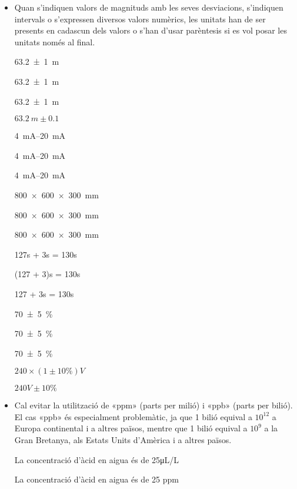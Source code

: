 \begin{itemize}

\item Quan s'indiquen valors de magnituds amb les seves desviacions,
s'indiquen intervals o s'expressen diversos valors numèrics, les
unitats han de ser presents en cadascun dels valors o s'han d'usar
parèntesis si es vol posar les unitats només al final.

\textcolor{Green}\faCheckSquare{} \SI[separate-uncertainty, multi-part-units = repeat]{63,2(1)}{m}

\textcolor{Green}\faCheckSquare{} \SI[separate-uncertainty]{63,2(1)}{m}

\textcolor{Red}\faTimesCircle{} \SI[separate-uncertainty, multi-part-units = single]{63,2(1)}{m}

\textcolor{Red}\faTimesCircle{}  $\SI{63,2}{m} \pm \num{0,1}$


\textcolor{Green}\faCheckSquare{} \SIrange{4}{20}{mA}

\textcolor{Green}\faCheckSquare{} \SIrange[range-units = brackets]{4}{20}{mA}

\textcolor{Red}\faTimesCircle{} \SIrange[range-units = single]{4}{20}{mA}


\textcolor{Green}\faCheckSquare{} \SI{800 x 600 x 300}{mm}

\textcolor{Green}\faCheckSquare{} \SI[product-units = brackets]{800 x 600 x 300}{mm}

\textcolor{Red}\faTimesCircle{} \SI[product-units = single]{800 x 600 x 300}{mm}


\textcolor{Green}\faCheckSquare{} 127\unit{s} + 3\unit{s} = 130\unit{s}

\textcolor{Green}\faCheckSquare{}  (127 + 3)\unit{s} = 130\unit{s}

\textcolor{Red}\faTimesCircle{}  127 + 3\unit{s} = 130\unit{s}


\textcolor{Green}\faCheckSquare{} \SI[separate-uncertainty, multi-part-units = repeat]{70(5)}{\%}

\textcolor{Green}\faCheckSquare{} \SI[separate-uncertainty]{70(5)}{\%}

\textcolor{Red}\faTimesCircle{} \SI[separate-uncertainty, multi-part-units = single]{70(5)}{\%}


\textcolor{Green}\faCheckSquare{} $240 \times (1 \pm 10\unit{\%})\unit{V}$

\textcolor{Red}\faTimesCircle{}  $240\unit{V} \pm 10\unit{\%}$


\item Cal evitar la utilització de «ppm» (parts per milió) i «ppb» (parts per bilió). El cas «ppb» és especialment problemàtic, ja que 1 bilió equival a $10^{12}$ a Europa continental i a altres països, mentre que 1 bilió equival a $10^{9}$ a la Gran Bretanya, als Estats Units d'Amèrica i a altres països.

\textcolor{Green}\faCheckSquare{} La concentració d'àcid en aigua és de 25\unit{\micro L/L}

\textcolor{Red}\faTimesCircle{} La concentració d'àcid en aigua és de 25 ppm

\end{itemize}


